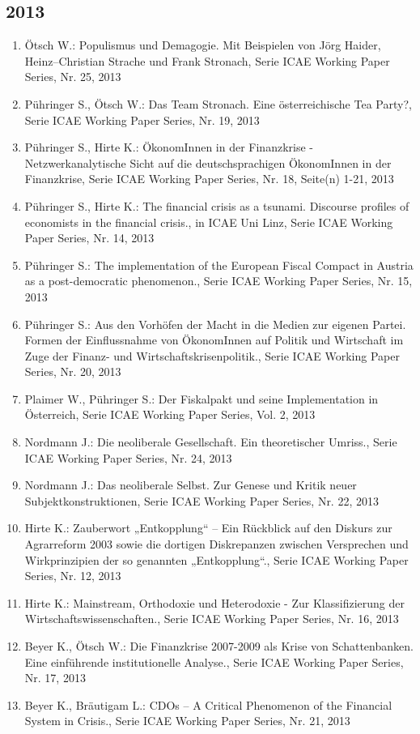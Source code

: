 \subsection*{2013}
\begin{enumerate}
    	 \item Ötsch W.: Populismus und Demagogie. Mit Beispielen von Jörg Haider, Heinz–Christian Strache und Frank Stronach, Serie ICAE Working Paper Series, Nr. 25, 2013
	 \item Pühringer S., Ötsch W.: Das Team Stronach. Eine österreichische Tea Party?, Serie ICAE Working Paper Series, Nr. 19, 2013
	 \item Pühringer S., Hirte K.: ÖkonomInnen in der Finanzkrise - Netzwerkanalytische Sicht auf die deutschsprachigen ÖkonomInnen in der Finanzkrise, Serie ICAE Working Paper Series, Nr. 18, Seite(n) 1-21, 2013
	 \item Pühringer S., Hirte K.: The financial crisis as a tsunami. Discourse profiles of economists in the financial crisis., in ICAE Uni Linz, Serie ICAE Working Paper Series, Nr. 14, 2013
	 \item Pühringer S.: The implementation of the European Fiscal Compact in Austria as a post-democratic phenomenon., Serie ICAE Working Paper Series, Nr. 15, 2013
	 \item Pühringer S.: Aus den Vorhöfen der Macht in die Medien zur eigenen Partei. Formen der Einflussnahme von ÖkonomInnen auf Politik und Wirtschaft im Zuge der Finanz-­ und Wirtschaftskrisenpolitik., Serie ICAE Working Paper Series, Nr. 20, 2013
	 \item Plaimer W., Pühringer S.: Der Fiskalpakt und seine Implementation in Österreich, Serie ICAE Working Paper Series, Vol. 2, 2013
	 \item Nordmann J.: Die neoliberale Gesellschaft. Ein theoretischer Umriss., Serie ICAE Working Paper Series, Nr. 24, 2013
	 \item Nordmann J.: Das neoliberale Selbst. Zur Genese und Kritik neuer Subjektkonstruktionen, Serie ICAE Working Paper Series, Nr. 22, 2013
	 \item Hirte K.: Zauberwort „Entkopplung“ – Ein Rückblick auf den Diskurs zur Agrarreform 2003 sowie die dortigen Diskrepanzen zwischen Versprechen und Wirkprinzipien der so genannten „Entkopplung“., Serie ICAE Working Paper Series, Nr. 12, 2013
	 \item Hirte K.: Mainstream, Orthodoxie und Heterodoxie - Zur Klassifizierung der Wirtschaftswissenschaften., Serie ICAE Working Paper Series, Nr. 16, 2013
	 \item Beyer K., Ötsch W.: Die Finanzkrise 2007-2009 als Krise von Schattenbanken. Eine einführende institutionelle Analyse., Serie ICAE Working Paper Series, Nr. 17, 2013
	 \item Beyer K., Bräutigam L.: CDOs – A Critical Phenomenon of the Financial System in Crisis., Serie ICAE Working Paper Series, Nr. 21, 2013
\end{enumerate}
